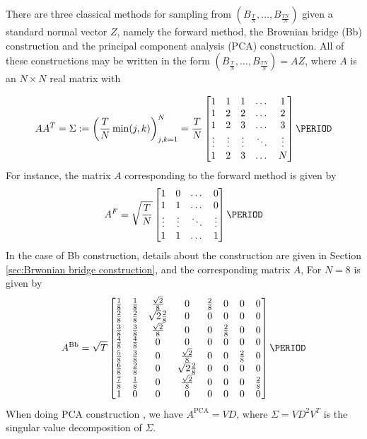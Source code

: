There are three classical methods for sampling from $\left(B_{\frac{T}{N}}, \dots, B_{\frac{T N}{N}}  \right)$ given a standard normal vector $Z$, namely the forward method, the Brownian bridge (Bb) construction and the principal component analysis (PCA) construction. All of these constructions may be written in the form $\left(B_{\frac{T}{N}}, \dots, B_{\frac{T N}{N}}  \right)=AZ$, where $A$ is an $N \times N$ real matrix with 

\begin{equation}\label{eq:covariance_matrix_in_time}
A A^T =\Sigma:= \left(\frac{T}{N} \min(j,k)\right)_{j,k=1}^N=\frac{T}{N} \begin{bmatrix}
	1       & 1 & 1 & \dots & 1\\
	1     & 2 & 2 & \dots & 2 \\
	1     & 2& 3 & \dots &3 \\
	\vdots    & \vdots& \vdots & \ddots &\vdots \\
	1      & 2 & 3 & \dots &N
\end{bmatrix}
\PERIOD
\end{equation}   
For instance, the matrix $A$ corresponding to the forward method is given by 
\begin{equation*}
	A^{F} = \sqrt{\frac{T}{N}}  \begin{bmatrix}
		1       & 0  & \dots & 0\\
		1     & 1  & \dots & 0 \\
		\vdots    & \vdots & \ddots &\vdots \\
		1      & 1&  \dots &1
	\end{bmatrix}
	\PERIOD
\end{equation*}  
In the case of Bb construction, details about the construction are given in Section \ref{sec:Brwonian bridge construction}, and  the corresponding matrix $A$, For $N=8$ is given by 
 \begin{equation*}
 	A^{\text{Bb}} = \sqrt{T}  \begin{bmatrix}
 		\frac{1}{8}       & 	\frac{1}{8}   & 	\frac{\sqrt{2}}{8} & 0 &\frac{2}{8}  & 0 &0 & 0\\
 	\frac{2}{8}       & 	\frac{2}{8}   & 	\sqrt{2}\frac{ 2}{8} & 0 &0 & 0 &0 & 0\\
 		\frac{3}{8}       & 	\frac{3}{8}   & 	\frac{\sqrt{2}}{8} & 0 &0 &\frac{2}{8} &0  &0 \\
 		 	\frac{4}{8}       & 	\frac{4}{8}   & 	0 & 0 &0 & 0 &0 & 0\\
 		 	\frac{5}{8}       & 	\frac{3}{8}   & 	0 & \frac{\sqrt{2}}{8} &0 &0 &\frac{2}{8} &0 \\
 		 		\frac{6}{8}       & 	\frac{2}{8}   & 	0 & \sqrt{2}\frac{ 2}{8}  &0 & 0 &0 & 0\\
 		 			\frac{7}{8}       & 	\frac{1}{8}   & 	0 & \frac{\sqrt{2}}{8} &0 &0 &0 &\frac{2}{8}  \\
 		 			1       & 0  & 	0 & 0 &0 &0 &0 &0 \\
 	
 	\end{bmatrix}
 	\PERIOD
 \end{equation*}
When doing PCA construction \cite{acworth1998comparison}, we have $A^{\text{PCA}}=VD$, where $\Sigma=V D^2V^T$ is the singular value decomposition of $\Sigma$. 
 
